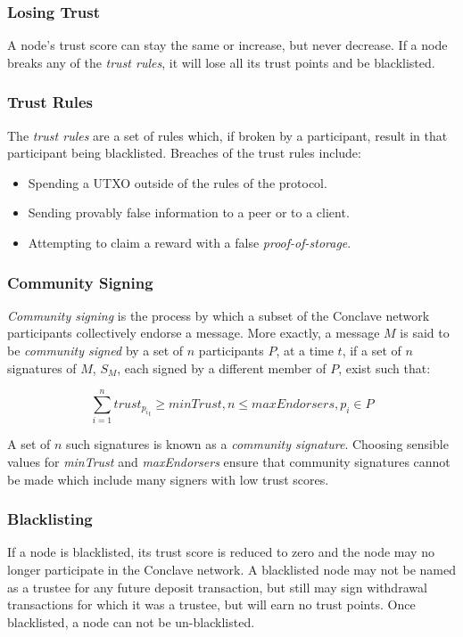 \documentclass{report}
\begin{document}
		\subsubsection{Losing Trust}
		A node's trust score can stay the same or increase, but never decrease. If a node breaks any of the \textit{trust rules}, it will lose all its trust points and be blacklisted.
		\subsubsection{Trust Rules}
		The \textit{trust rules} are a set of rules which, if broken by a participant, result in that participant being blacklisted. Breaches of the trust rules include:
		\begin{itemize}
			\item Spending a UTXO outside of the rules of the protocol.
			\item Sending provably false information to a peer or to a client.
			\item Attempting to claim a reward with a false \textit{proof-of-storage}.
		\end{itemize}
	
		\subsubsection{Community Signing} 
		\textit{Community signing} is the process by which a subset of the Conclave network participants collectively endorse a message. More exactly, a message $M$ is said to be \textit{community signed} by a set of $n$ participants $P$, at a time $t$, if a set of $n$ signatures of $M$, $S_M$, each signed by a different member of $P$, exist such that:
		
		\[ \sum_{i=1}^n trust_{{p_i}_t} \ge minTrust, n \le maxEndorsers, p_i \in P \]
		
		A set of $n$ such signatures is known as a \textit{community signature}. Choosing sensible values for \textit{minTrust} and \textit{maxEndorsers} ensure that community signatures cannot be made which include many signers with low trust scores.
		
		\subsubsection{Blacklisting} 
		If a node is blacklisted, its trust score is reduced to zero and the node may no longer participate in the Conclave network. A blacklisted node may not be named as a trustee for any future deposit transaction, but still may sign withdrawal transactions for which it was a trustee, but will earn no trust points. Once blacklisted, a node can not be un-blacklisted.
		
\end{document}
